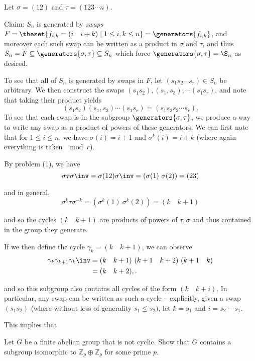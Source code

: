 \begin{solution}
  Let $\sigma= (12)$ and $\tau= (123\cdots n)$.

  Claim: $S_n$ is generated by \textit{swaps} $F = \theset{f_{i, k} = (i \quad i+k) \mid 1 \leq i, k \leq n} = \generators{f_{i, k}}$, and moreover each such swap can be written as a product in $\sigma$ and $\tau$, and thus $S_n = F \subseteq \generators{\sigma, \tau} \subseteq S_n$ which force $\generators{\sigma, \tau} = \S_n$ as desired.

  To see that all of $S_n$ is generated by swaps in $F$, let $(s_1 s_2 \cdots s_r) \in S_n$ be arbitrary. We then construct the swaps $(s_1 s_2), (s_1, s_3), \cdots (s_1 s_r)$, and note that taking their product yields
  $$
  (s_1 s_2)(s_1, s_3)\cdots(s_1 s_r) = (s_1 s_2 s_3 \cdots s_r).
  $$
  To see that each swap is in the subgroup $\generators{\sigma, \tau}$, we produce a way to write any swap as a product of powers of these generators. We can first note that for $1 \leq i \leq n$, we have $\sigma(i) = i+1$ and $\sigma^k(i) = i+k$ (where again everything is taken $\mod r$).

  By problem (1), we have
  $$
  \sigma\tau\sigma\inv = \sigma(1 2)\sigma\inv = (\sigma(1) ~\sigma(2)) = (2 3)
  $$

  and in general,
  $$
  \sigma^k\tau \sigma^{-k} = (\sigma^k(1) ~\sigma^k(2)) = (k\quad k+1)
  $$

  and so the cycles $(k\quad k+1)$ are products of powers of $\tau, \sigma$ and thus contained in the group they generate.

  If we then define the cycle $\gamma_k = (k\quad k+1)$, we can observe
  \begin{align*}
    \gamma_k \gamma_{k+1}\gamma_{k}\inv &= (k\quad k+1)~(k+1\quad k+2)~(k+1 \quad k) \\
    &= (k\quad k+2),
  .\end{align*}

  and so this subgroup also contains all cycles of the form $(k\quad k+i)$. In particular, any swap can be written as such a cycle -- explicitly, given a swap $(s_1 s_2)$ (where without loss of generality $s_1 \leq s_2)$, let $k=s_1$ and $i = s_2 - s_1$.

  This implies that

\end{solution}

\begin{problem}[Hungerford 2.2.1]
\label{prob:1.3}
Let $G$ be a finite abelian group that is not cyclic. Show that $G$ contains a subgroup isomorphic to $\mathbb{Z}_p \oplus \mathbb{Z}_p$ for some prime $p$.
\end{problem}

